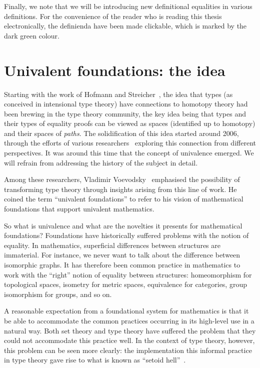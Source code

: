 Finally, we note that we will be introducing new definitional equalities in various
definitions. For the convenience of the reader who is reading this thesis electronically,
the definienda have been made clickable, which is marked by the
{\color{darkgreen} dark green} colour.

\section{Univalent foundations: the idea}

Starting with the work of Hofmann and Streicher~\cite{hofmann-streicher}, the idea that
types (as conceived in intensional type theory) have connections to homotopy theory had
been brewing in the type theory community, the key idea being that types and their types
of equality proofs can be viewed as spaces (identified up to homotopy) and
their spaces of \emph{paths}. The solidification of this idea started around 2006, through
the efforts of various researchers~\cite{warren-fmcs, uppsala-awodey, uppsala-garner, uppsala-van-den-berg, voevodsky-very-short}
exploring this connection from different perspectives. It was around this time that the
concept of univalence emerged. We will refrain from addressing the history of the subject
in detail.

Among these researchers, Vladimir Voevodsky~\cite{voevodsky-bernays} emphasised the
possibility of transforming type theory through insights arising from this line of work.
He coined the term ``univalent foundations'' to refer to his vision of mathematical
foundations that support univalent mathematics.

So what is univalence and what are the novelties it presents for mathematical foundations?
Foundations have historically suffered problems with the notion of equality. In
mathematics, superficial differences between structures are immaterial. For instance, we
never want to talk about the difference between isomorphic graphs. It has therefore been
common practice in mathematics to work with the ``right'' notion of equality between
structures: homeomorphism for topological spaces, isometry for metric spaces, equivalence
for categories, group isomorphism for groups, and so on.

A reasonable expectation from a foundational system for mathematics is that it be able to
accommodate the common practices occurring in its high-level use in a natural way. Both
set theory and type theory have suffered the problem that they could not accommodate this
practice well. In the context of type theory, however, this problem can be seen more
clearly: the implementation this informal practice in type theory gave rise to what is
known as ``setoid hell''~\cite{homotopy-heaven}.

